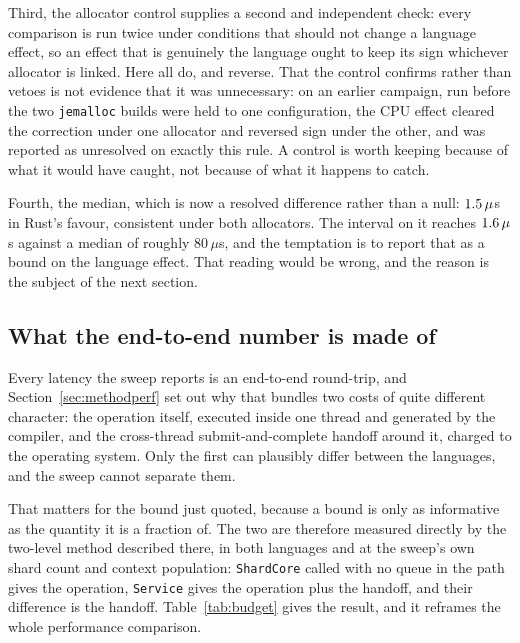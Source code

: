 \documentclass[english,twoside,openright,a4paper,censored,csm,software-track-2020]{HYthesisML}
\begin{document}
Third, the allocator control supplies a second and independent check: every comparison is run
twice under conditions that should not change a language effect, so an effect that is genuinely
the language ought to keep its sign whichever allocator is linked. Here
\CrossAllocConsistent{} all do, and \NCrossAllocReversed{} reverse. That the control confirms
rather than vetoes is not evidence that it was unnecessary: on an earlier campaign, run before the
two \texttt{jemalloc} builds were held to one configuration, the CPU effect cleared the correction
under one allocator and reversed sign under the other, and was reported as unresolved on exactly
this rule. A control is worth keeping because of what it would have caught, not because of what
it happens to catch.

Fourth, the median, which is now a resolved difference rather than a null: $1.5\,\mu$s
in Rust's favour, consistent under both allocators. The interval on it reaches
$1.6\,\mu$s against a median of roughly $80\,\mu$s, and the temptation is to report
that as a bound on the language effect. That reading would be wrong, and the reason is the
subject of the next section.

\subsection{What the end-to-end number is made of}\label{sec:budget}
Every latency the sweep reports is an end-to-end round-trip, and
Section~\ref{sec:methodperf} set out why that bundles two costs of quite different character:
the operation itself, executed inside one thread and generated by the compiler, and the
cross-thread submit-and-complete handoff around it, charged to the operating system. Only the
first can plausibly differ between the languages, and the sweep cannot separate them.

That matters for the bound just quoted, because a bound is only as informative as the quantity
it is a fraction of. The two are therefore measured directly by the two-level method described
there, in both languages and at the sweep's own shard count and context population:
\texttt{ShardCore} called with no queue in the path gives the operation, \texttt{Service} gives
the operation plus the handoff, and their difference is the handoff.
Table~\ref{tab:budget} gives the result, and it reframes the whole performance comparison.
\end{document}
